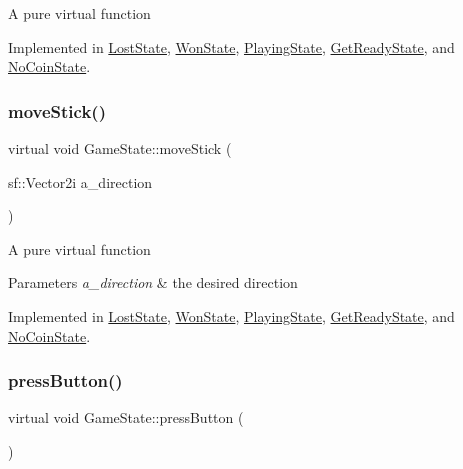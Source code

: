 A pure virtual function 

Implemented in \hyperlink{class_lost_state_aa35179942033d9ab54fbcd7122f40497}{Lost\+State}, \hyperlink{class_won_state_aeaab03fa1a39188c19107047417c65b6}{Won\+State}, \hyperlink{class_playing_state_a936d41a2041ace2ccb67a9b779d113a7}{Playing\+State}, \hyperlink{class_get_ready_state_afac1da927d38cf32960f2370856ec9f6}{Get\+Ready\+State}, and \hyperlink{class_no_coin_state_a417209eadad2f71284cf09d369bc389e}{No\+Coin\+State}.

\mbox{\label{class_game_state_aaae8c1b3ae6969eb2dd81bfc12fbf43f}} 
\subsubsection{\texorpdfstring{move\+Stick()}{moveStick()}}
{\footnotesize\ttfamily virtual void Game\+State\+::move\+Stick (\begin{DoxyParamCaption}\item[{sf\+::\+Vector2i}]{a\+\_\+direction }\end{DoxyParamCaption})\hspace{0.3cm}{\ttfamily [pure virtual]}}

A pure virtual function


\begin{DoxyParams}{Parameters}
{\em a\+\_\+direction} & the desired direction \\
\hline
\end{DoxyParams}


Implemented in \hyperlink{class_lost_state_abc978a14604451eee5e0373b4ad374c8}{Lost\+State}, \hyperlink{class_won_state_a56b272d25511e6a302136d308648464b}{Won\+State}, \hyperlink{class_playing_state_af205fbb130a2c83b260d80359de914e8}{Playing\+State}, \hyperlink{class_get_ready_state_a0a7f1548b4c58e8bd5634ceb59ba7b9b}{Get\+Ready\+State}, and \hyperlink{class_no_coin_state_a9fe8f36082705e6f5833244890093adc}{No\+Coin\+State}.

\mbox{\label{class_game_state_aa14eeaf244bcf19b7013af75cb722dde}} 
\subsubsection{\texorpdfstring{press\+Button()}{pressButton()}}
{\footnotesize\ttfamily virtual void Game\+State\+::press\+Button (\begin{DoxyParamCaption}{ }\end{DoxyParamCaption})\hspace{0.3cm}{\ttfamily [pure virtual]}}

